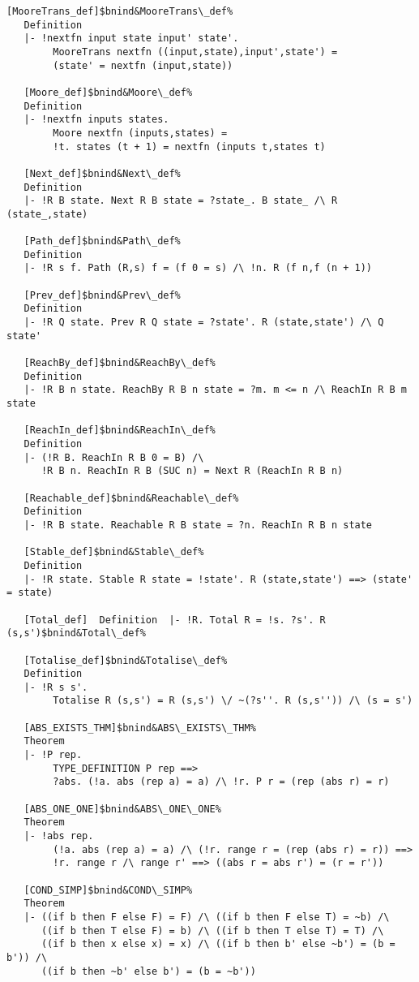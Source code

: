 \documentclass[12pt]{article}
\begin{document}
\begin{footnotesize}
\begin{Verbatim}[commandchars=\$\&\%]
   [MooreTrans_def]$bnind&MooreTrans\_def%
   Definition
   |- !nextfn input state input' state'.
        MooreTrans nextfn ((input,state),input',state') =
        (state' = nextfn (input,state))
   
   [Moore_def]$bnind&Moore\_def%
   Definition
   |- !nextfn inputs states.
        Moore nextfn (inputs,states) =
        !t. states (t + 1) = nextfn (inputs t,states t)
   
   [Next_def]$bnind&Next\_def%
   Definition
   |- !R B state. Next R B state = ?state_. B state_ /\ R (state_,state)
   
   [Path_def]$bnind&Path\_def%
   Definition
   |- !R s f. Path (R,s) f = (f 0 = s) /\ !n. R (f n,f (n + 1))
   
   [Prev_def]$bnind&Prev\_def%
   Definition
   |- !R Q state. Prev R Q state = ?state'. R (state,state') /\ Q state'
   
   [ReachBy_def]$bnind&ReachBy\_def%
   Definition
   |- !R B n state. ReachBy R B n state = ?m. m <= n /\ ReachIn R B m state
   
   [ReachIn_def]$bnind&ReachIn\_def%
   Definition
   |- (!R B. ReachIn R B 0 = B) /\
      !R B n. ReachIn R B (SUC n) = Next R (ReachIn R B n)
   
   [Reachable_def]$bnind&Reachable\_def%
   Definition
   |- !R B state. Reachable R B state = ?n. ReachIn R B n state
   
   [Stable_def]$bnind&Stable\_def%
   Definition 
   |- !R state. Stable R state = !state'. R (state,state') ==> (state' = state)
   
   [Total_def]  Definition  |- !R. Total R = !s. ?s'. R (s,s')$bnind&Total\_def%
   
   [Totalise_def]$bnind&Totalise\_def%
   Definition
   |- !R s s'.
        Totalise R (s,s') = R (s,s') \/ ~(?s''. R (s,s'')) /\ (s = s')
   
   [ABS_EXISTS_THM]$bnind&ABS\_EXISTS\_THM%
   Theorem
   |- !P rep.
        TYPE_DEFINITION P rep ==>
        ?abs. (!a. abs (rep a) = a) /\ !r. P r = (rep (abs r) = r)
   
   [ABS_ONE_ONE]$bnind&ABS\_ONE\_ONE%
   Theorem
   |- !abs rep.
        (!a. abs (rep a) = a) /\ (!r. range r = (rep (abs r) = r)) ==>
        !r. range r /\ range r' ==> ((abs r = abs r') = (r = r'))
   
   [COND_SIMP]$bnind&COND\_SIMP%
   Theorem
   |- ((if b then F else F) = F) /\ ((if b then F else T) = ~b) /\
      ((if b then T else F) = b) /\ ((if b then T else T) = T) /\
      ((if b then x else x) = x) /\ ((if b then b' else ~b') = (b = b')) /\
      ((if b then ~b' else b') = (b = ~b'))
   

\end{Verbatim}
\end{footnotesize}
\end{document}
